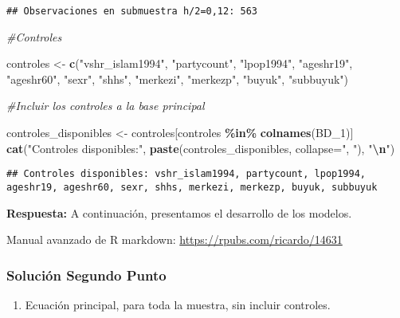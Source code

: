 \documentclass[
]{article}
\newenvironment{Shaded}{\begin{snugshade}}{\end{snugshade}}
\newcommand{\AttributeTok}[1]{\textcolor[rgb]{0.13,0.29,0.53}{#1}}
\newcommand{\CommentTok}[1]{\textcolor[rgb]{0.56,0.35,0.01}{\textit{#1}}}
\newcommand{\FunctionTok}[1]{\textcolor[rgb]{0.13,0.29,0.53}{\textbf{#1}}}
\newcommand{\NormalTok}[1]{#1}
\newcommand{\OtherTok}[1]{\textcolor[rgb]{0.56,0.35,0.01}{#1}}
\newcommand{\SpecialCharTok}[1]{\textcolor[rgb]{0.81,0.36,0.00}{\textbf{#1}}}
\newcommand{\StringTok}[1]{\textcolor[rgb]{0.31,0.60,0.02}{#1}}
\providecommand{\tightlist}{%
  \setlength{\itemsep}{0pt}\setlength{\parskip}{0pt}}
\begin{document}
\begin{verbatim}
## Observaciones en submuestra h/2=0,12: 563
\end{verbatim}

\begin{Shaded}
\begin{Highlighting}[]
\CommentTok{\#Controles}

\NormalTok{controles }\OtherTok{\textless{}{-}} \FunctionTok{c}\NormalTok{(}\StringTok{"vshr\_islam1994"}\NormalTok{, }\StringTok{"partycount"}\NormalTok{, }\StringTok{"lpop1994"}\NormalTok{,}
               \StringTok{"ageshr19"}\NormalTok{, }\StringTok{"ageshr60"}\NormalTok{, }\StringTok{"sexr"}\NormalTok{, }\StringTok{"shhs"}\NormalTok{,}
               \StringTok{"merkezi"}\NormalTok{, }\StringTok{"merkezp"}\NormalTok{, }\StringTok{"buyuk"}\NormalTok{, }\StringTok{"subbuyuk"}\NormalTok{)}

\CommentTok{\#Incluir los controles a la base principal}

\NormalTok{controles\_disponibles }\OtherTok{\textless{}{-}}\NormalTok{ controles[controles }\SpecialCharTok{\%in\%} \FunctionTok{colnames}\NormalTok{(BD\_1)]}
\FunctionTok{cat}\NormalTok{(}\StringTok{"Controles disponibles:"}\NormalTok{, }\FunctionTok{paste}\NormalTok{(controles\_disponibles, }\AttributeTok{collapse=}\StringTok{", "}\NormalTok{), }\StringTok{"}\SpecialCharTok{\textbackslash{}n}\StringTok{"}\NormalTok{)}
\end{Highlighting}
\end{Shaded}

\begin{verbatim}
## Controles disponibles: vshr_islam1994, partycount, lpop1994, ageshr19, ageshr60, sexr, shhs, merkezi, merkezp, buyuk, subbuyuk
\end{verbatim}

\textbf{Respuesta:} A continuación, presentamos el desarrollo de los
modelos.

Manual avanzado de R markdown: \url{https://rpubs.com/ricardo/14631}

\subsubsection{Solución Segundo Punto}\label{soluciuxf3n-segundo-punto}

\begin{enumerate}
\def\labelenumi{\alph{enumi})}
\tightlist
\item
  Ecuación principal, para toda la muestra, sin incluir controles.
\end{enumerate}
\end{document}
